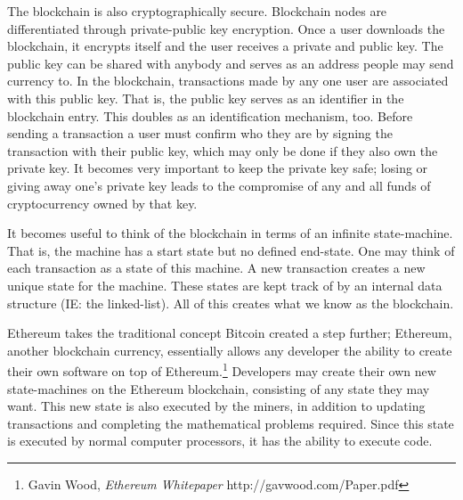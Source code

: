 \documentclass[]{article}
\begin{document}
The blockchain is also cryptographically secure. Blockchain nodes are differentiated through private-public key encryption. Once a user downloads the blockchain, it encrypts itself and the user receives a private and public key. The public key can be shared with anybody and serves as an address people may send currency to. In the blockchain, transactions made by any one user are associated with this public key. That is, the public key serves as an identifier in the blockchain entry. This doubles as an identification mechanism, too. Before sending a transaction a user must confirm who they are by signing the transaction with their public key, which may only be done if they also own the private key. It becomes very important to keep the private key safe; losing or giving away one's private key leads to the compromise of any and all funds of cryptocurrency owned by that key. 

It becomes useful to think of the blockchain in terms of an infinite state-machine. That is, the machine has a start state but no defined end-state. One may think of each transaction as a state of this machine. A new transaction creates a new unique state for the machine. These states are kept track of by an internal data structure (IE: the linked-list). All of this creates what we know as the blockchain.

Ethereum takes the traditional concept Bitcoin created a step further; Ethereum, another blockchain currency, essentially allows any developer the ability to create their own software on top of Ethereum.\footnote{Gavin Wood, \textit{Ethereum Whitepaper} http://gavwood.com/Paper.pdf} Developers may create their own new state-machines on the Ethereum blockchain, consisting of any state they may want. This new state is also executed by the miners, in addition to updating transactions and completing the mathematical problems required. Since this state is executed by normal computer processors, it has the ability to execute code.
\end{document}
